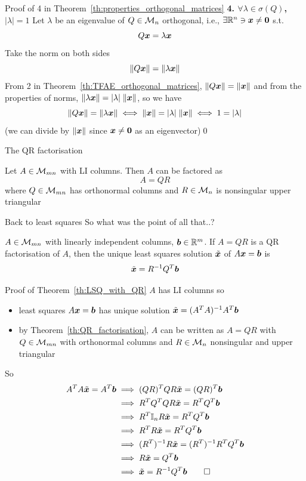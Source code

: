 \documentclass[aspectratio=169]{beamer}\usepackage[]{graphicx}\usepackage[]{xcolor}
\begin{document}
\begin{frame}{Proof of 4 in Theorem~\ref{th:properties_orthogonal_matrices}}
\textbf{4. $\forall\lambda\in\sigma(Q)$, $|\lambda|=1$}
\vfill
Let $\lambda$ be an eigenvalue of $Q\in\mathcal{M}_n$ orthogonal, i.e., $\exists\IR^n\ni\bx\neq\b0$ s.t.
\[
Q\bm{x} = \lambda\bm{x}
\]
Take the norm on both sides
\[
\|Q\bm{x}\| = \|\lambda\bm{x}\|
\]
From 2 in Theorem~\ref{th:TFAE_orthogonal_matrices}, $\|Q\bm{x}\|=\|\bm{x}\|$ and from the properties of norms, $\|\lambda\bm{x}\|=|\lambda|\;\|\bm{x}\|$, so we have
\[
\|Q\bm{x}\| = \|\lambda\bm{x}\| \iff \|\bm{x}\| = |\lambda|\;\|\bm{x}\| \iff 1=|\lambda|
\]
(we can divide by $\|\bm{x}\|$ since $\bx\neq \b0$ as an eigenvector)\hfill\qed
\end{frame}





\begin{frame}{The QR factorisation}
\begin{importanttheorem}\label{th:QR_factorisation}
Let $A\in\mathcal{M}_{mn}$ with LI columns. Then $A$ can be factored as
\[
A=QR
\]
where $Q\in\mathcal{M}_{mn}$ has orthonormal columns and $R\in\mathcal{M}_n$ is nonsingular upper triangular
\end{importanttheorem}
\end{frame}


\begin{frame}{Back to least squares}
So what was the point of all that..?
\vfill
\begin{importanttheorem}
\label{th:LSQ_with_QR}
$A\in\mathcal{M}_{mn}$ with linearly independent columns, $\bm{b}\in\mathbb{R}^m$. If $A=QR$ is a QR factorisation of $A$, then the unique least squares solution $\tilde{\bm{x}}$ of $A\bm{x}=\bm{b}$ is
\[
\tilde{\bm{x}} = R^{-1}Q^T\bm{b}
\]
\end{importanttheorem}
\end{frame}


\begin{frame}{Proof of Theorem~\ref{th:LSQ_with_QR}}
$A$ has LI columns so 
\begin{itemize}
\item least squares $A\bm{x}=\bm{b}$ has unique solution $\tilde{\bm{x}}=(A^TA)^{-1}A^T\bm{b}$
\item by Theorem~\ref{th:QR_factorisation}, $A$ can be written as $A=QR$ with $Q\in\mathcal{M}_{mn}$ with orthonormal columns and $R\in\mathcal{M}_n$ nonsingular and upper triangular
\end{itemize}
So
\begin{align*}
A^TA\tilde\bx= A^T\bb &\implies (QR)^TQR\tilde\bx = (QR)^T\bb \\
&\implies R^TQ^TQR\tilde\bx = R^TQ^T\bb \\
&\implies R^T\II_nR\tilde\bx = R^TQ^T\bb \\
&\implies R^TR\tilde\bx = R^TQ^T\bb \\
&\implies (R^T)^{-1}R\tilde\bx = (R^T)^{-1}R^TQ^T\bb \\
&\implies R\tilde\bx = Q^T\bb \\
&\implies \tilde\bx = R^{-1}Q^T\bb\hfill\qed
\end{align*}
\end{frame}
\end{document}

